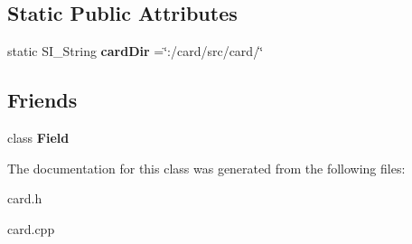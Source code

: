 \subsection*{Static Public Attributes}
\begin{DoxyCompactItemize}
\item 
\mbox{\label{class_card_a02f1c740facc2458b2199a1802263147}} 
static S\+I\+\_\+\+String {\bfseries card\+Dir} =\char`\"{}\+:/card/src/card/\char`\"{}
\end{DoxyCompactItemize}
\subsection*{Friends}
\begin{DoxyCompactItemize}
\item 
\mbox{\label{class_card_aaec47a26a3c11c1debd3ed922b69cbd2}} 
class {\bfseries Field}
\end{DoxyCompactItemize}


The documentation for this class was generated from the following files\+:\begin{DoxyCompactItemize}
\item 
card.\+h\item 
card.\+cpp\end{DoxyCompactItemize}
